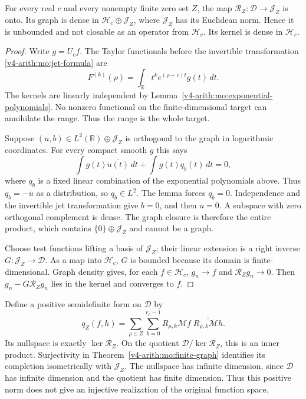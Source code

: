 \begin{theorem}
\label{v4-arith:mo:finite-graph}
For every real $c$ and every nonempty finite zero set $Z$, the map
$\mathcal R_Z:\mathscr D\to\mathscr J_Z$ is onto. Its graph is
dense in $\mathscr H_c\oplus\mathscr J_Z$, where $\mathscr J_Z$
has its Euclidean norm. Hence it is unbounded and not closable
as an operator from $\mathscr H_c$. Its kernel is dense in
$\mathscr H_c$.
\end{theorem}
\begin{proof}
Write $g=U_cf$. The Taylor functionals before the invertible
transformation \eqref{v4-arith:mo:jet-formula} are
\[
 F^{(k)}(\rho)=\int_{\mathbb R}t^k
                       e^{(\rho-c)t}g(t)\,dt.
\]
The kernels are linearly independent by
Lemma~\ref{v4-arith:mo:exponential-polynomials}. No nonzero functional on the
finite-dimensional target can annihilate the range. Thus the
range is the whole target.

Suppose $(u,b)\in L^2(\mathbb R)\oplus\mathscr J_Z$ is orthogonal
to the graph in logarithmic coordinates. For every compact smooth
$g$ this says
\[
 \int g(t)\overline{u(t)}\,dt+\int g(t)q_b(t)\,dt=0,
\]
where $q_b$ is a fixed linear combination of the exponential
polynomials above. Thus $q_b=-\overline u$ as a distribution,
so $q_b\in L^2$. The lemma forces $q_b=0$. Independence and the
invertible jet transformation give $b=0$, and then $u=0$.
A subspace with zero orthogonal complement is dense. The graph
closure is therefore the entire product, which contains
$\{0\}\oplus\mathscr J_Z$ and cannot be a graph.

Choose test functions lifting a basis of $\mathscr J_Z$; their
linear extension is a right inverse $G:\mathscr J_Z\to\mathscr D$.
As a map into $\mathscr H_c$, $G$ is bounded because its domain is
finite-dimensional. Graph density gives, for each $f\in\mathscr H_c$,
$g_n\to f$ and $\mathcal R_Zg_n\to0$. Then
$g_n-G\mathcal R_Zg_n$ lies in the kernel and converges to $f$.
\end{proof}

Define a positive semidefinite form on $\mathscr D$ by
\[
 q_Z(f,h)=\sum_{\rho\in Z}\sum_{k=0}^{r_\rho-1}
 R_{\rho,k}\mathcal Mf\;
 \overline{R_{\rho,k}\mathcal Mh}.
\]
Its nullspace is exactly $\ker\mathcal R_Z$. On the quotient
$\mathscr D/\ker\mathcal R_Z$, this is an inner product.
Surjectivity in Theorem~\ref{v4-arith:mo:finite-graph} identifies its completion
isometrically with $\mathscr J_Z$. The nullspace has infinite
dimension, since $\mathscr D$ has infinite dimension and the
quotient has finite dimension. Thus this positive norm does not
give an injective realization of the original function space.


